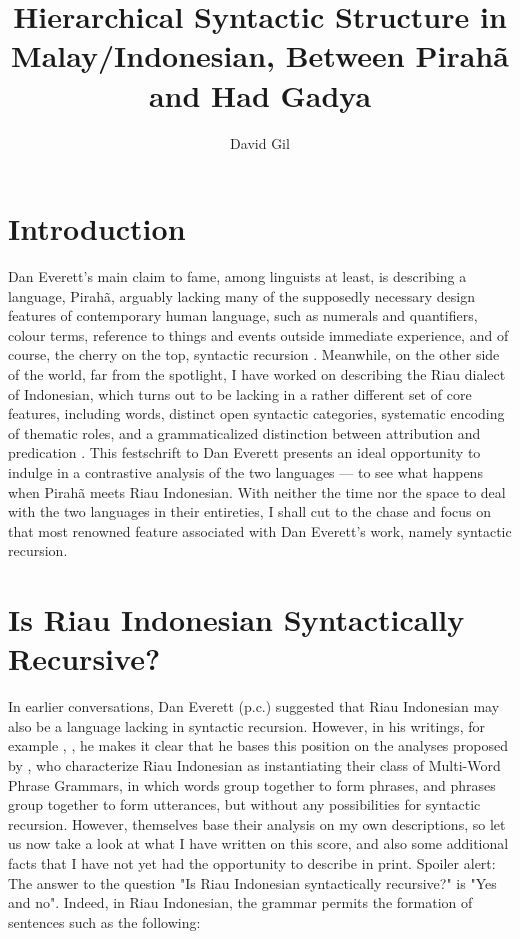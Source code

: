 \documentclass[output=paper,colorlinks,citecolor=brown
]{langscibook}
\author{David Gil\affiliation{Max Planck Institute for Evolutionary Anthropology}}
\title{Hierarchical Syntactic Structure in Malay/Indonesian,
Between Pirahã and Had Gadya}
\begin{document}
\maketitle


\section{Introduction}
Dan Everett's main claim to fame, among linguists at least, is describing a language, Pirahã, arguably lacking many of the supposedly necessary design features of contemporary human language, such as numerals and quantifiers, colour terms, reference to things and events outside immediate experience, and of course, the cherry on the top, syntactic recursion \citep{everett2005cultural}. Meanwhile, on the other side of the world, far from the spotlight, I have worked on describing the Riau dialect of Indonesian, which turns out to be lacking in a rather different set of core features, including words, distinct open syntactic categories, systematic encoding of thematic roles, and a grammaticalized distinction between attribution and predication \citep{gil2005word,gil2006intonation,gil2012predication,gil2013riau, gil2017isolating, gil2020isolating}. This festschrift to Dan Everett presents an ideal opportunity to indulge in a contrastive analysis of the two languages — to see what happens when Pirahã meets Riau Indonesian. With neither the time nor the space to deal with the two languages in their entireties, I shall cut to the chase and focus on that most renowned feature associated with Dan Everett's work, namely syntactic recursion.

\section{Is Riau Indonesian Syntactically Recursive?}
In earlier conversations, Dan Everett (p.c.) suggested that Riau Indonesian may also be a language lacking in syntactic recursion. However, in his writings, for example \citet{futrell2016corpus}, \citet{everett2017grammar}, he makes it clear that he bases this position on the analyses proposed by \citet{jackendoff2014syntax, jackendoff2017linear}, who characterize Riau Indonesian as instantiating their class of Multi-Word Phrase Grammars, in which words group together to form phrases, and phrases group together to form utterances, but without any possibilities for syntactic recursion. However, \cite{jackendoff2014syntax, jackendoff2017linear} themselves base their analysis on my own descriptions, so let us now take a look at what I have written on this score, and also some additional facts that I have not yet had the opportunity to describe in print. Spoiler alert: The answer to the question "Is Riau Indonesian syntactically recursive?" is "Yes and no".
Indeed, in Riau Indonesian, the grammar permits the formation of sentences such as the following:
\end{document}
